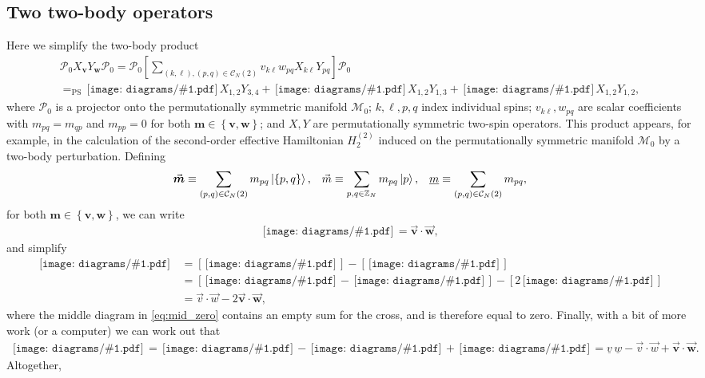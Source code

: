 \documentclass[nofootinbib,notitlepage,11pt]{revtex4-2}
\newcommand{\p}[1]{\left(#1\right)} %
\renewcommand{\sp}[1]{\left[#1\right]} %
\renewcommand{\set}[1]{\left\{#1\right\}} %
\renewcommand{\c}{\cdot} %
\newcommand{\m}{\bm} %
\renewcommand{\v}{\vec} %
\newcommand{\1}{\mathds{1}}
\newcommand{\C}{\mathcal{C}}
\newcommand{\M}{\mathcal{M}}
\renewcommand{\P}{\mathcal{P}}
\newcommand{\ZZ}{\mathbb{Z}}
\newcommand{\EQPS}{=_{\text{PS}}}
\newcommand{\col}{\underline}
\newcommand{\diagram}[1]
{\,\texttt{[image: diagrams/\#1.pdf]}\,}
\begin{document}
\subsection{Two two-body operators}
\label{sec:two_pair_prod}

Here we simplify the two-body product
\begin{multline}
  \P_0 X_{\m v} Y_{\m w} \P_0
  = \P_0 \sp{\sum_{\p{k,\ell},\p{p,q}\in\C_N\p{2}}
    v_{k\ell} w_{pq} X_{k\ell} Y_{pq}} \P_0 \\
  \EQPS \diagram{two_body_0} X_{1,2} Y_{3,4}
  + \diagram{two_body_1} X_{1,2} Y_{1,3}
  + \diagram{two_body_2} X_{1,2} Y_{1,2},
\end{multline}
where $\P_0$ is a projector onto the permutationally symmetric
manifold $\M_0$; $k,\ell,p,q$ index individual spins;
$v_{k\ell},w_{pq}$ are scalar coefficients with $m_{pq}=m_{qp}$ and
$m_{pp}=0$ for both $\m m\in\set{\m v,\m w}$; and $X,Y$ are
permutationally symmetric two-spin operators.  This product appears,
for example, in the calculation of the second-order effective
Hamiltonian $H_2^{(2)}$ induced on the permutationally symmetric
manifold $\M_0$ by a two-body perturbation.  Defining
\begin{align}
  \v{\m m} \equiv \sum_{\p{p,q}\in\C_N\p{2}} m_{pq} \ket{\set{p,q}},
  &&
  \v m \equiv \sum_{p,q\in\ZZ_N} m_{pq} \ket{p},
  &&
  \col{m} \equiv \sum_{\p{p,q}\in\C_N\p{2}} m_{pq},
\end{align}
for both $\m m\in\set{\m v,\m w}$, we can write
\begin{align}
  \diagram{two_body_2} = \v{\m v} \c\v{\m w},
\end{align}
and simplify
\begin{align}
  \diagram{two_body_1}
  &= \sp{\diagram{two_body_1_o}} - \sp{\diagram{two_body_1_x}} \\
  &= \sp{\diagram{two_body_1_oo} - \diagram{two_body_1_ox}}
  - \sp{2\diagram{two_body_2}} \label{eq:mid_zero} \\
  &= \v v \c \v w - 2 \v{\m v} \c \v{\m w},
\end{align}
where the middle diagram in \eqref{eq:mid_zero} contains an empty sum
for the cross, and is therefore equal to zero.  Finally, with a bit of
more work (or a computer) we can work out that
\begin{align}
  \diagram{two_body_0}
  = \diagram{two_body_0_oooo} - \diagram{two_body_1_ooo}
  + \diagram{two_body_2_oo}
  = \col{v}\,\col{w} -\v v\c\v w + \v{\m v}\c\v{\m w}.
\end{align}
Altogether,
\end{document}
